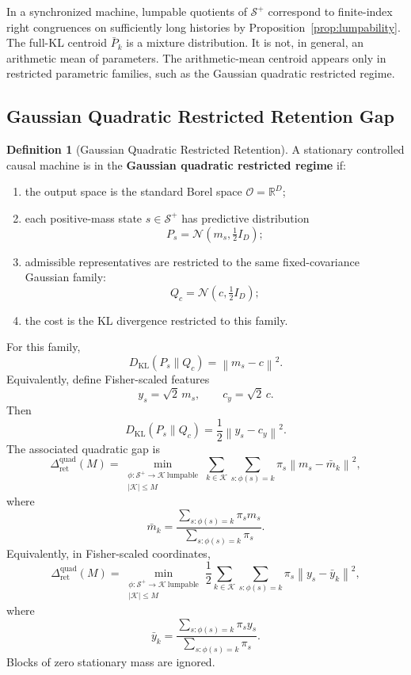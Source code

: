\documentclass[12pt]{article}
\theoremstyle{definition}
\newtheorem{definition}[theorem]{Definition}
\newcommand{\norm}[1]{\left\lVert#1\right\rVert}
\newcommand{\RetQuad}{\Delta_{\mathrm{ret}}^{\mathrm{quad}}}
\newcommand{\Splus}{\mathcal S^{+}}
\begin{document}
In a synchronized machine, lumpable quotients of $\Splus$ correspond to
finite-index right congruences on sufficiently long histories by
Proposition~\ref{prop:lumpability}.  The full-KL centroid $\bar P_k$ is a
mixture distribution.  It is not, in general, an arithmetic mean of
parameters.  The arithmetic-mean centroid appears only in restricted
parametric families, such as the Gaussian quadratic restricted regime.

\subsection{Gaussian Quadratic Restricted Retention Gap}
\label{subsec:gaussian-quadratic}

\begin{definition}[Gaussian Quadratic Restricted Retention]
\label{def:gaussian-quadratic}
A stationary controlled causal machine is in the \textbf{Gaussian quadratic
restricted regime} if:
\begin{enumerate}[label=(\arabic*)]
\item the output space is the standard Borel space $\mathcal O=\mathbb R^D$;
\item each positive-mass state $s\in\Splus$ has predictive distribution
\[
P_s=\mathcal N(m_s,\tfrac12 I_D);
\]
\item admissible representatives are restricted to the same fixed-covariance
Gaussian family:
\[
Q_c=\mathcal N(c,\tfrac12 I_D);
\]
\item the cost is the KL divergence restricted to this family.
\end{enumerate}
For this family,
\[
D_{\mathrm{KL}}(P_s\|Q_c)
=
\norm{m_s-c}^2.
\]
Equivalently, define Fisher-scaled features
\[
y_s=\sqrt{2}\,m_s,
\qquad
c_y=\sqrt{2}\,c.
\]
Then
\[
D_{\mathrm{KL}}(P_s\|Q_c)
=
\frac12
\norm{y_s-c_y}^2.
\]
The associated quadratic gap is
\[
\RetQuad(M)
=
\min_{\substack{
\phi:\Splus\to\mathcal K\ \text{lumpable}\\
|\mathcal K|\le M
}}
\sum_{k\in\mathcal K}
\sum_{s:\phi(s)=k}
\pi_s
\norm{m_s-\bar m_k}^2,
\]
where
\[
\bar m_k
=
\frac{
\sum_{s:\phi(s)=k}\pi_s m_s
}{
\sum_{s:\phi(s)=k}\pi_s
}.
\]
Equivalently, in Fisher-scaled coordinates,
\[
\RetQuad(M)
=
\min_{\substack{
\phi:\Splus\to\mathcal K\ \text{lumpable}\\
|\mathcal K|\le M
}}
\frac12
\sum_{k\in\mathcal K}
\sum_{s:\phi(s)=k}
\pi_s
\norm{y_s-\bar y_k}^2,
\]
where
\[
\bar y_k
=
\frac{
\sum_{s:\phi(s)=k}\pi_s y_s
}{
\sum_{s:\phi(s)=k}\pi_s
}.
\]
Blocks of zero stationary mass are ignored.
\end{definition}
\end{document}
